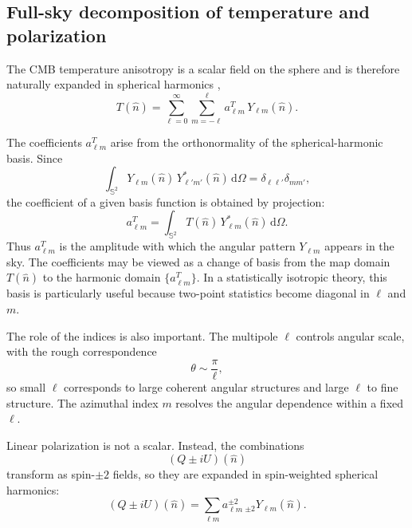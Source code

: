 \documentclass[11pt]{article}
\newcommand{\dd}{\mathrm{d}}
\begin{document}
\subsection{Full-sky decomposition of temperature and polarization}

The CMB temperature anisotropy is a scalar field on the sphere and is therefore naturally expanded in spherical harmonics \cite{zaldarriaga1997,gorski2005},
\begin{equation}
  T(\hat n) = \sum_{\ell=0}^\infty \sum_{m=-\ell}^{\ell} a_{\ell m}^T\,Y_{\ell m}(\hat n).
\end{equation}

The coefficients \(a_{\ell m}^T\) arise from the orthonormality of the spherical-harmonic basis. Since
\begin{equation}
  \int_{\mathbb S^2} Y_{\ell m}(\hat n)\,Y_{\ell' m'}^\ast(\hat n)\,\dd\Omega
  =
  \delta_{\ell\ell'}\delta_{mm'},
\end{equation}
the coefficient of a given basis function is obtained by projection:
\begin{equation}
  a_{\ell m}^T
  =
  \int_{\mathbb S^2} T(\hat n)\,Y_{\ell m}^\ast(\hat n)\,\dd\Omega.
\end{equation}
Thus \(a_{\ell m}^T\) is the amplitude with which the angular pattern \(Y_{\ell m}\) appears in the sky. The coefficients may be viewed as a change of basis from the map domain \(T(\hat n)\) to the harmonic domain \(\{a_{\ell m}^T\}\). In a statistically isotropic theory, this basis is particularly useful because two-point statistics become diagonal in \(\ell\) and \(m\).

The role of the indices is also important. The multipole \(\ell\) controls angular scale, with the rough correspondence
\begin{equation}
  \theta \sim \frac{\pi}{\ell},
\end{equation}
so small \(\ell\) corresponds to large coherent angular structures and large \(\ell\) to fine structure. The azimuthal index \(m\) resolves the angular dependence within a fixed \(\ell\).

Linear polarization is not a scalar. Instead, the combinations
\begin{equation}
  (Q \pm iU)(\hat n)
\end{equation}
transform as spin-\(\pm 2\) fields, so they are expanded in spin-weighted spherical harmonics:
\begin{equation}
  (Q \pm iU)(\hat n)
  =
  \sum_{\ell m}
  a_{\ell m}^{\pm 2}\,{}_{\pm 2}Y_{\ell m}(\hat n).
\end{equation}
\end{document}
